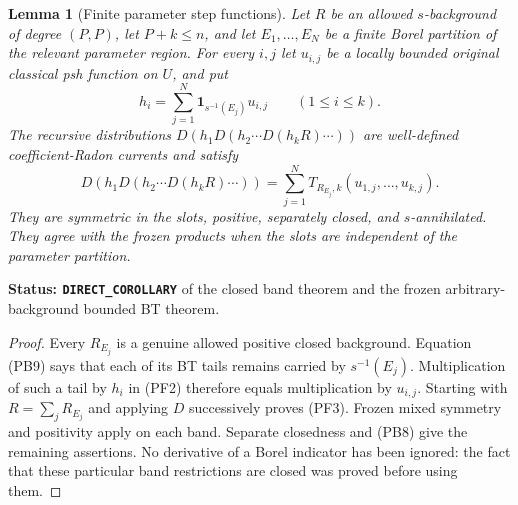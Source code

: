 \documentclass[11pt,a4paper]{article}
\numberwithin{equation}{section}
\newtheorem{lemma}[theorem]{Lemma}
\theoremstyle{definition}
\theoremstyle{remark}
\begin{document}
\begin{lemma}[Finite parameter step functions]
\label{lem:r12-finite-parameter-step-products}
Let $R$ be an allowed $s$-background of degree $(P,P)$, let
$P+k\le n$, and let $E_1,\ldots,E_N$ be a finite Borel partition
of the relevant parameter region. For every $i,j$ let $u_{i,j}$ be
a locally bounded original classical psh function on $U$, and put
\[
               h_i=\sum_{j=1}^N\mathbf1_{s^{-1}(E_j)}u_{i,j}
                          \qquad(1\le i\le k).
 \tag{PF2}
\]
The recursive distributions $D(h_1D(h_2\cdots D(h_kR)\cdots))$
are well-defined coefficient-Radon currents and satisfy
\[
 D(h_1D(h_2\cdots D(h_kR)\cdots))
              =\sum_{j=1}^N T_{R_{E_j},k}(u_{1,j},\ldots,u_{k,j}).
 \tag{PF3}
\]
They are symmetric in the slots, positive, separately closed, and
$s$-annihilated. They agree with the frozen products when the slots
are independent of the parameter partition.
\end{lemma}

\noindent\textbf{Status: \texttt{DIRECT\_COROLLARY}} of the closed
band theorem and the frozen arbitrary-background bounded BT theorem.

\begin{proof}
Every $R_{E_j}$ is a genuine allowed positive closed background.
Equation (PB9) says that each of its BT tails remains carried by
$s^{-1}(E_j)$. Multiplication of such a tail by $h_i$ in (PF2)
therefore equals multiplication by $u_{i,j}$. Starting with
$R=\sum_jR_{E_j}$ and applying $D$ successively proves (PF3).
Frozen mixed symmetry and positivity apply on each band. Separate
closedness and (PB8) give the remaining assertions. No derivative
of a Borel indicator has been ignored: the fact that these particular
band restrictions are closed was proved before using them.
\end{proof}
\end{document}
